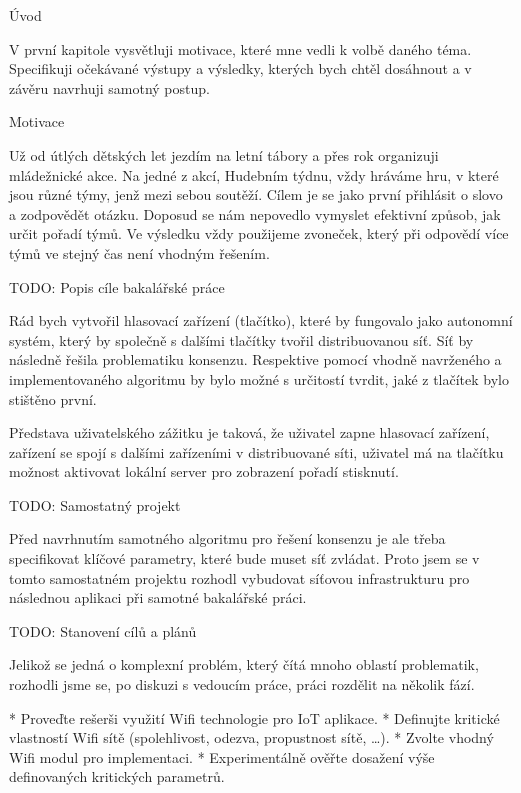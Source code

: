 
\def\ctustyle{{\ssr CTUstyle}}
\def\ttb{\tt\char`\\} %

\chap Úvod

V první kapitole vysvětluji motivace, které mne vedli k volbě daného téma. Specifikuji očekávané výstupy a výsledky, kterých bych chtěl dosáhnout a v závěru navrhuji samotný postup.

\sec Motivace

Už od útlých dětských let jezdím na letní tábory a přes rok organizuji mládežnické akce. Na jedné z akcí, Hudebním týdnu, vždy hráváme hru, v které jsou různé týmy, jenž mezi sebou soutěží. Cílem je se jako první přihlásit o slovo a zodpovědět otázku. Doposud se nám nepovedlo vymyslet efektivní způsob, jak určit pořadí týmů. Ve výsledku vždy použijeme zvoneček, který při odpovědí více týmů ve stejný čas není vhodným řešením.


\sec TODO: Popis cíle bakalářské práce

Rád bych vytvořil hlasovací zařízení (tlačítko), které by fungovalo jako autonomní systém, který by společně s dalšími tlačítky tvořil distribuovanou síť. Síť by následně řešila problematiku konsenzu. Respektive pomocí vhodně navrženého a implementovaného algoritmu by bylo možné s určitostí tvrdit, jaké z tlačítek bylo stištěno první. 

Představa uživatelského zážitku je taková, že uživatel zapne hlasovací zařízení, zařízení se spojí s dalšími zařízeními v distribuované síti, uživatel má na tlačítku možnost aktivovat lokální server pro zobrazení pořadí stisknutí.

\sec TODO: Samostatný projekt

Před navrhnutím samotného algoritmu pro řešení konsenzu je ale třeba specifikovat klíčové parametry, které bude muset síť zvládat. Proto jsem se v tomto samostatném projektu rozhodl vybudovat síťovou infrastrukturu pro následnou aplikaci při samotné bakalářské práci. 


\sec TODO: Stanovení cílů a plánů

Jelikož se jedná o komplexní problém, který čítá mnoho oblastí problematik, rozhodli jsme se, po diskuzi s vedoucím práce, práci rozdělit na několik fází.


\begitems
* Proveďte rešerši využití Wifi technologie pro IoT aplikace.
* Definujte kritické vlastností Wifi sítě (spolehlivost, odezva, propustnost sítě, …).
* Zvolte vhodný Wifi modul pro implementaci.
* Experimentálně ověřte dosažení výše definovaných kritických parametrů.
\enditems